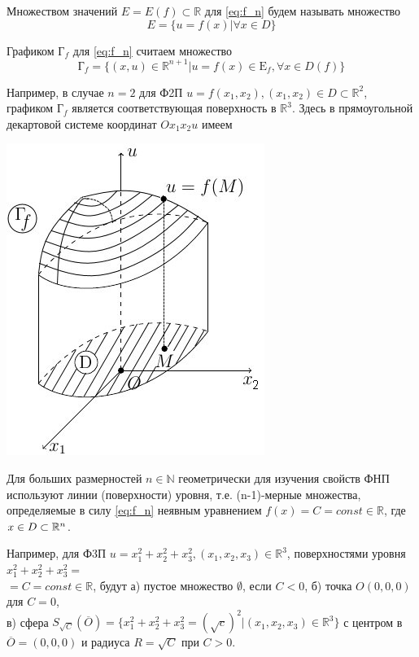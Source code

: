 Множеством значений $E = E(f) \subset \mathbb{R}$ для \eqref{eq:f_n} будем называть множество
\begin{equation*}
E = \{ u = f(x) | \forall x \in D \}
\end{equation*}

Графиком $\text{Г}_f$ для \eqref{eq:f_n} считаем множество
\begin{equation*}
\text{Г}_f = \{ (x, u) \in \mathbb{R}^{n+1} | u = f(x) \in \text{E}_f, \forall x \in D(f) \}
\end{equation*}

Например, в случае $n = 2$ для Ф2П $u = f(x_1, x_2), (x_1, x_2) \in D \subset \mathbb{R}^{2}$, графиком $\text{Г}_f$ является соответствующая поверхность в $\mathbb{R}^{3}$. Здесь в прямоугольной декартовой системе координат $O x_1 x_2 u$ имеем \\
\begin{center}
	\includegraphics[scale=0.7]{img/2_2.jpg}
\end{center}
Для больших размерностей $n \in \mathbb{N}$ геометрически для изучения свойств ФНП используют линии (поверхности) уровня, т.е. (n-1)-мерные множества, определяемые в силу \eqref{eq:f_n} неявным уравнением $f(x) = C = const \in \mathbb{R}$, где $x \in D \subset \mathbb{R}^n$.

Например, для Ф3П $u = x_1^2 + x_2^2 + x_3^2, (x_1, x_2, x_3) \in \mathbb{R}^3$, поверхностями уровня $ x_1^2 + x_2^2 + x_3^2 = $ \\ $ = C  = const \in \mathbb{R}$, будут а) пустое множество $\emptyset$, если $C < 0$, б) точка $O(0, 0, 0)$ для $C = 0$,\\ в) сфера $S_{\sqrt{C}} (\overline{O}) = \{ x_1^2 + x_2^2 + x_3^2 = (\sqrt{c})^2 | (x_1, x_2, x_3) \in \mathbb{R}^3 \}$ с центром в $\overline{O} = (0, 0, 0)$ и радиуса $R = \sqrt{C}$ при $C > 0$.

